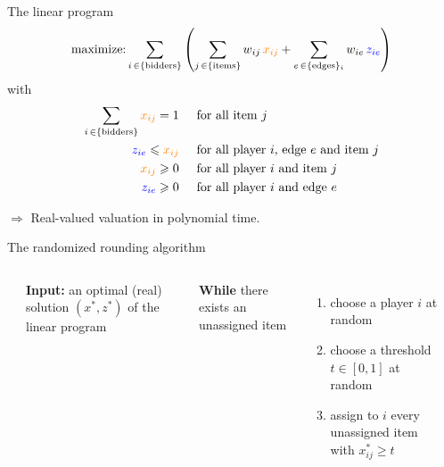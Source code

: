 \documentclass[aspectratio=169]{beamer}
\begin{document}
\begin{frame}{The linear program}
    \[
        \text{maximize:} \sum_{i \,\in \{\text{bidders}\}} \left(
        \sum_{j \,\in \{\text{items}\}} w_{ij}\, {\color{orange} x_{ij}}
        + \sum_{e \,\in \{\text{edges}\}_i} w_{ie}\, {\color{blue} z_{ie}}
        \right)
    \]
    with
    \begin{align*}
        \sum_{i \,\in \{\text{bidders}\}} {\color{orange} x_{ij}}  = 1 & \hspace{.5cm} \text{for all item \(j\)}                              \\
        {\color{blue} z_{ie}}  \leqslant {\color{orange} x_{ij}}       & \hspace{.5cm} \text{for all player \(i\), edge \(e\) and item \(j\)} \\
        {\color{orange} x_{ij}}   \geqslant 0                          & \hspace{.5cm} \text{for all player \(i\) and item \(j\)}             \\
        {\color{blue} z_{ie}}  \geqslant 0                             & \hspace{.5cm} \text{for all player \(i\) and edge \(e\)}
    \end{align*}

    $\Rightarrow$ Real-valued valuation in \alert{polynomial time}.
\end{frame}

\begin{frame}{The randomized rounding algorithm}
    \begin{columns}
        \hrule
        \vspace{.1cm}
        \textbf{Input:} an optimal (real) solution \((x^*, z^*)\) of the linear program

        \vspace{.5cm}
        \textbf{While} there exists an unassigned item
        \begin{enumerate}
            \item choose a player \(i\) at random
            \item choose a threshold \(t \in [0, 1]\) at random
            \item assign to \(i\) every unassigned item with \(x_{ij}^* \geqslant t\)
        \end{enumerate}
        \hrule

    \end{columns}
\end{frame}
\end{document}
